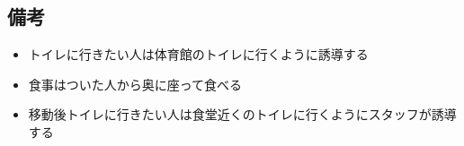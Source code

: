 \subsection{備考}
\begin{itemize}
  \item トイレに行きたい人は体育館のトイレに行くように誘導する
  \item 食事はついた人から奥に座って食べる
  \item 移動後トイレに行きたい人は食堂近くのトイレに行くようにスタッフが誘導する
\end{itemize}




%
